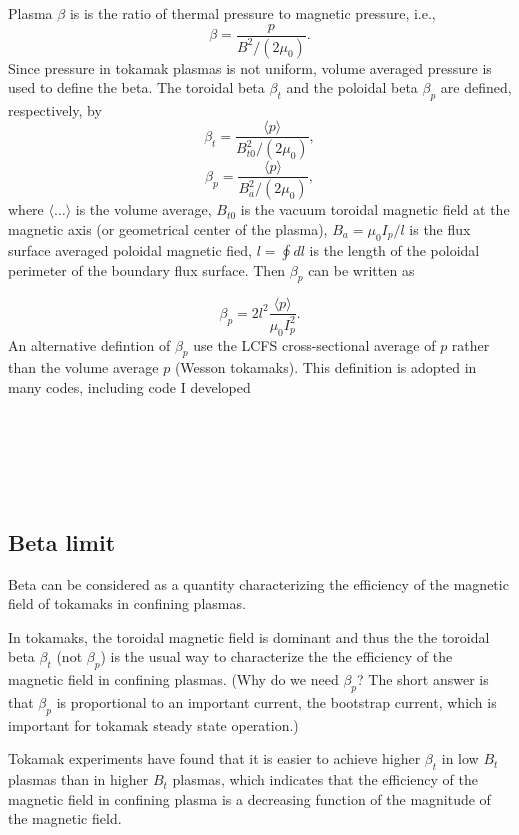 \documentclass{llncs}
\begin{document}
Plasma $\beta$ is is the ratio of thermal pressure to magnetic pressure, i.e.,
\begin{equation}
  \beta = \frac{p}{B^2 / (2 \mu_0)} .
\end{equation}
Since pressure in tokamak plasmas is not uniform, volume averaged pressure is
used to define the beta. The toroidal beta $\beta_t$ and the poloidal beta
$\beta_p$ are defined, respectively, by
\begin{equation}
  \beta_t = \frac{\langle p \rangle}{B^2_{t 0} / (2 \mu_0)},
\end{equation}
\begin{equation}
  \beta_p = \frac{\langle p \rangle}{B_a^2 / (2 \mu_0)},
\end{equation}
where $\langle \ldots \rangle$ is the volume average, $B_{t 0}$ is the vacuum
toroidal magnetic field at the magnetic axis (or geometrical center of the
plasma), $B_a = \mu_0 I_p / l$ is the flux surface averaged poloidal magnetic
fied, $l = \oint d l$ is the length of the poloidal perimeter of the boundary
flux surface. Then $\beta_p$ can be written as


\begin{equation}
  \label{7-25-1m} \beta_p = 2 l^2 \frac{\langle p \rangle}{\mu_0 I_p^2} .
\end{equation}
An alternative defintion of $\beta_p$ use the LCFS cross-sectional average of
$p$ rather than the volume average $p$ (Wesson tokamaks). This definition is
adopted in many codes, including  code I developed

\

\

\

\subsection{Beta limit}

Beta can be considered as a quantity characterizing the efficiency of the
magnetic field of tokamaks in confining plasmas.

In tokamaks, the toroidal magnetic field is dominant and thus the the toroidal
beta $\beta_t$ (not $\beta_p$) is the usual way to characterize the the
efficiency of the magnetic field in confining plasmas. (Why do we need
$\beta_p$? The short answer is that $\beta_p$ is proportional to an important
current, the bootstrap current, which is important for tokamak steady state
operation.)

Tokamak experiments have found that it is easier to achieve higher $\beta_t$
in low $B_t$ plasmas than in higher $B_t$ plasmas, which indicates that the
efficiency of the magnetic field in confining plasma is a decreasing function
of the magnitude of the magnetic field.
\end{document}
